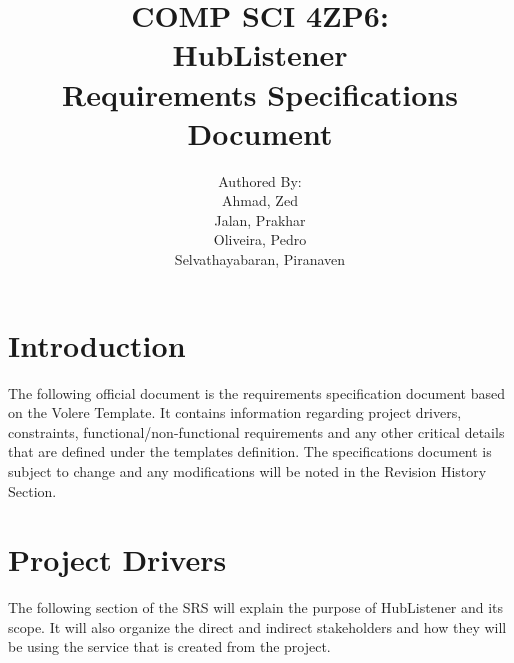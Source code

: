 \documentclass{article}
\title{COMP SCI 4ZP6:\\ \textbf{HubListener}\\ Requirements Specifications Document}
\author{ Authored By:
\\ Ahmad, Zed
\\ Jalan, Prakhar 
\\ Oliveira, Pedro
\\ Selvathayabaran, Piranaven
}
\date{}
\begin{document}
\newpage
\maketitle
\newpage
\tableofcontents {}
\newpage


\section{Introduction}

The following official document is the requirements specification document based on the Volere Template. It contains information regarding project drivers, constraints, functional/non-functional requirements and any other critical details that are defined under the templates definition. The specifications document is subject to change and any modifications will be noted in the Revision History Section. 
\newpage

\section{Project Drivers}

The following section of the SRS will explain the purpose of HubListener and its scope. It will also organize the direct and indirect stakeholders and how they will be using the service that is created from the project.  
\end{document}
